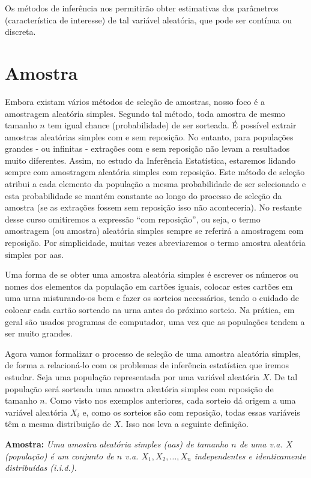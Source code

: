 \documentclass[
]{book}
\begin{document}
Os métodos de inferência nos permitirão obter estimativas dos parâmetros (característica de interesse) de tal variável aleatória, que pode ser contínua ou discreta.

\hypertarget{amostra}{%
\section{Amostra}\label{amostra}}

Embora existam vários métodos de seleção de amostras, nosso foco é a amostragem aleatória simples. Segundo tal método, toda amostra de mesmo tamanho \(n\) tem igual chance (probabilidade) de ser sorteada. É possível extrair amostras aleatórias simples com e sem reposição. No entanto, para populações grandes - ou infinitas - extrações com e sem reposição não levam a resultados muito diferentes. Assim, no estudo da Inferência Estatística, estaremos lidando sempre com amostragem aleatória simples com reposição. Este método de seleção atribui a cada elemento da população a mesma probabilidade de ser selecionado e esta probabilidade se mantém constante ao longo do processo de seleção da amostra (se as extrações fossem sem reposição isso não aconteceria). No restante desse curso omitiremos a expressão ``com reposição'', ou seja, o termo amostragem (ou amostra) aleatória simples sempre se referirá a amostragem com reposição. Por simplicidade, muitas vezes abreviaremos o termo amostra aleatória simples por aas.

Uma forma de se obter uma amostra aleatória simples é escrever os números ou nomes dos elementos da população em cartões iguais, colocar estes cartões em uma urna misturando-os bem e fazer os sorteios necessários, tendo o cuidado de colocar cada cartão sorteado na urna antes do próximo sorteio. Na prática, em geral são usados programas de computador, uma vez que as populações tendem a ser muito grandes.

Agora vamos formalizar o processo de seleção de uma amostra aleatória simples, de forma a relacioná-lo com os problemas de inferência estatística que iremos estudar. Seja uma população representada por uma variável aleatória \(X\). De tal população será sorteada uma amostra aleatória simples com reposição de tamanho \(n\). Como visto nos exemplos anteriores, cada sorteio dá origem a uma variável aleatória \(X_i\) e, como os sorteios são com reposição, todas essas variáveis têm a mesma distribuição de \(X\). Isso nos leva a seguinte definição.

\textbf{Amostra:} \emph{Uma amostra aleatória simples (aas) de tamanho $n$ de uma v.a. $X$ (população) é um conjunto de $n$ v.a. $X_1, X_2, \ldots, X_n$ independentes e identicamente
distribuídas (i.i.d.).}
\end{document}
